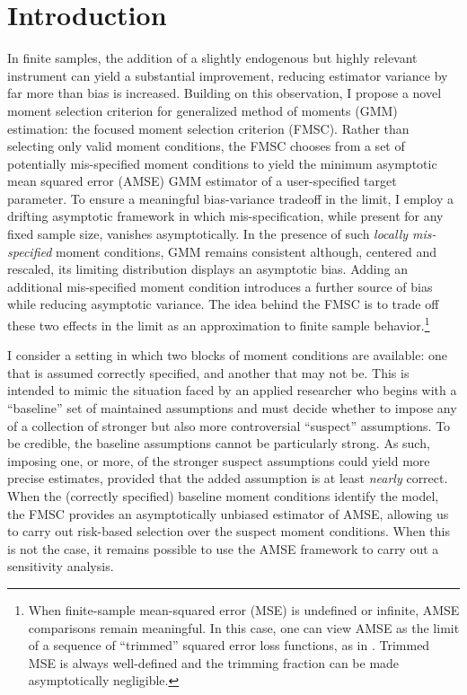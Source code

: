 \section{Introduction}
In finite samples, the addition of a slightly endogenous but highly relevant instrument can yield a substantial improvement, reducing estimator variance by far more than bias is increased. 
Building on this observation, I propose a novel moment selection criterion for generalized method of moments (GMM) estimation: the focused moment selection criterion (FMSC). 
Rather than selecting only valid moment conditions, the FMSC chooses from a set of potentially mis-specified moment conditions to yield the minimum asymptotic mean squared error (AMSE) GMM estimator of a user-specified target parameter.
To ensure a meaningful bias-variance tradeoff in the limit, I employ a drifting asymptotic framework in which mis-specification, while present for any fixed sample size, vanishes asymptotically.
In the presence of such \emph{locally mis-specified} moment conditions, GMM remains consistent although, centered and rescaled, its limiting distribution displays an asymptotic bias. Adding an additional mis-specified moment condition introduces a further source of bias while reducing asymptotic variance. 
The idea behind the FMSC is to trade off these two effects in the limit as an approximation to finite sample behavior.\footnote{When finite-sample mean-squared error (MSE) is undefined or infinite, AMSE comparisons remain meaningful. In this case, one can view AMSE as the limit of a sequence of ``trimmed'' squared error loss functions, as in \cite{Hansen2013}. Trimmed MSE is always well-defined and the trimming fraction can be made asymptotically negligible.}
 
I consider a setting in which two blocks of moment conditions are available: one that is assumed correctly specified, and another that may not be.
This is intended to mimic the situation faced by an applied researcher who begins with a ``baseline'' set of maintained assumptions and must decide whether to impose any of a collection of stronger but also more controversial ``suspect'' assumptions.
To be credible, the baseline assumptions cannot be particularly strong.
As such, imposing one, or more, of the stronger suspect assumptions could yield more precise estimates, provided that the added assumption is at least \emph{nearly} correct.
When the (correctly specified) baseline moment conditions identify the model, the FMSC provides an asymptotically unbiased estimator of AMSE, allowing us to carry out risk-based selection over the suspect moment conditions.
When this is not the case, it remains possible to use the AMSE framework to carry out a sensitivity analysis. 

